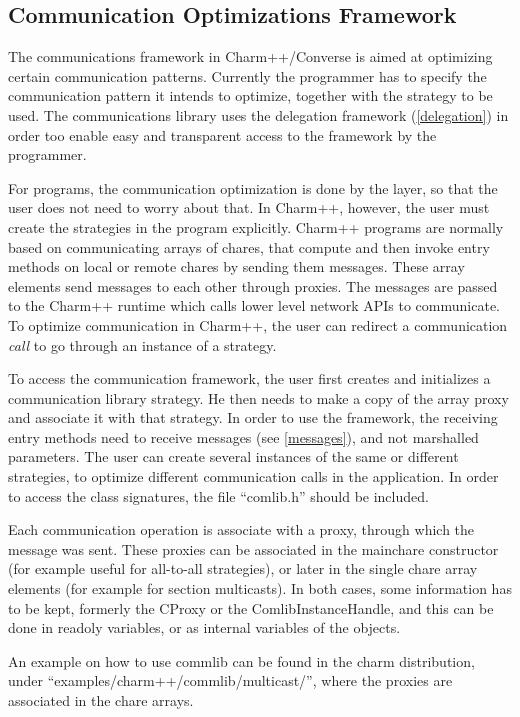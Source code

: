 \subsection{Communication Optimizations Framework}

The communications framework in Charm++/Converse is aimed at optimizing certain
communication patterns. Currently the programmer has to specify the
communication pattern it intends to optimize, together with the strategy to be
used. The communications library uses the delegation framework
(\ref{delegation}) in order too enable easy and transparent access to the
framework by the programmer.

For \ampi{} programs, the communication optimization is done by the \ampi{}
layer, so that the user does not need to worry about that. In Charm++, however,
the user must create the strategies in the program explicitly. Charm++ programs
are normally based on communicating arrays of chares, that compute and then
invoke entry methods on local or remote chares by sending them messages. These
array elements send messages to each other through proxies. The messages are
passed to the Charm++ runtime which calls lower level network APIs to
communicate. To optimize communication in Charm++, the user can redirect a
communication {\em call} to go through an instance of a strategy.

To access the communication framework, the user first creates and initializes a
communication library strategy. He then needs to make a copy of the array proxy
and associate it with that strategy. In order to use the framework, the
receiving entry methods need to receive messages (see \ref{messages}), and not
marshalled parameters. The user can create several instances of the same or
different strategies, to optimize different communication calls in the
application. In order to access the class signatures, the file ``comlib.h''
should be included.

Each communication operation is associate with a proxy, through which the
message was sent. These proxies can be associated in the mainchare constructor
(for example useful for all-to-all strategies), or later in the single chare
array elements (for example for section multicasts). In both cases, some
information has to be kept, formerly the CProxy or the ComlibInstanceHandle, and
this can be done in readoly variables, or as internal variables of the objects.

An example on how to use commlib can be found in the charm distribution, under
``examples/charm++/commlib/multicast/'', where the proxies are associated in the
chare arrays.


